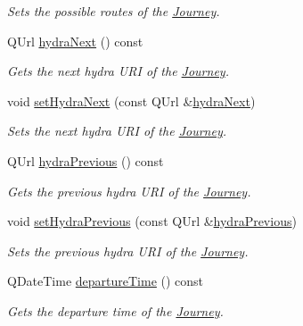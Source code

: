 \begin{DoxyCompactItemize}
\begin{DoxyCompactList}\small\item\em Sets the possible routes of the \mbox{\hyperlink{classQRail_1_1RouterEngine_1_1Journey}{Journey}}. \end{DoxyCompactList}\item 
Q\+Url \mbox{\hyperlink{classQRail_1_1RouterEngine_1_1Journey_af2e3a86d876b397e5a88b89aea673145}{hydra\+Next}} () const
\begin{DoxyCompactList}\small\item\em Gets the next hydra U\+RI of the \mbox{\hyperlink{classQRail_1_1RouterEngine_1_1Journey}{Journey}}. \end{DoxyCompactList}\item 
void \mbox{\hyperlink{classQRail_1_1RouterEngine_1_1Journey_a79b4e4ae7edc0508cf05d1c250713283}{set\+Hydra\+Next}} (const Q\+Url \&\mbox{\hyperlink{classQRail_1_1RouterEngine_1_1Journey_af2e3a86d876b397e5a88b89aea673145}{hydra\+Next}})
\begin{DoxyCompactList}\small\item\em Sets the next hydra U\+RI of the \mbox{\hyperlink{classQRail_1_1RouterEngine_1_1Journey}{Journey}}. \end{DoxyCompactList}\item 
Q\+Url \mbox{\hyperlink{classQRail_1_1RouterEngine_1_1Journey_a670dbe08bcc3ce8e8003a0429661e18f}{hydra\+Previous}} () const
\begin{DoxyCompactList}\small\item\em Gets the previous hydra U\+RI of the \mbox{\hyperlink{classQRail_1_1RouterEngine_1_1Journey}{Journey}}. \end{DoxyCompactList}\item 
void \mbox{\hyperlink{classQRail_1_1RouterEngine_1_1Journey_acdb5fa099702119d04b57b23737e2bdf}{set\+Hydra\+Previous}} (const Q\+Url \&\mbox{\hyperlink{classQRail_1_1RouterEngine_1_1Journey_a670dbe08bcc3ce8e8003a0429661e18f}{hydra\+Previous}})
\begin{DoxyCompactList}\small\item\em Sets the previous hydra U\+RI of the \mbox{\hyperlink{classQRail_1_1RouterEngine_1_1Journey}{Journey}}. \end{DoxyCompactList}\item 
Q\+Date\+Time \mbox{\hyperlink{classQRail_1_1RouterEngine_1_1Journey_a58b92b24d9d29ebb3cb47994b92eaa13}{departure\+Time}} () const
\begin{DoxyCompactList}\small\item\em Gets the departure time of the \mbox{\hyperlink{classQRail_1_1RouterEngine_1_1Journey}{Journey}}. \end{DoxyCompactList}\item 

\end{DoxyCompactItemize}
